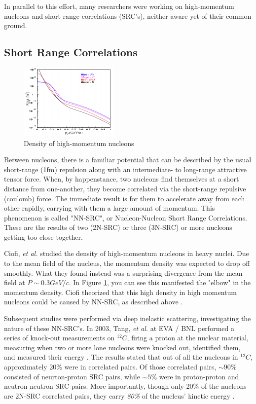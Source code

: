 \documentclass[11pt]{article}
\begin{document}
In parallel to this effort, many researchers were working on high-momentum nucleons and short range correlations (SRC's), neither aware yet of their common ground.

\subsection{Short Range Correlations}

\begin{figure}
  \begin{center}
    \includegraphics[width=0.43\textwidth]{src.png}
  \end{center}
  \caption{Density of high-momentum nucleons \cite{PhysRevC.76.055206}}
  \label{fig:src}
\end{figure}

Between nucleons, there is a familiar potential that can be described by the usual short-range (1fm) repulsion along with an intermediate- to long-range attractive tensor force. When, by happenstance, two nucleons find themselves at a short distance from one-another, they become correlated via the short-range repulsive (coulomb) force. The immediate result is for them to accelerate away from each other rapidly, carrying with them a large amount of momentum. This phenomenon is called "NN-SRC", or Nucleon-Nucleon Short Range Correlations. These are the results of two (2N-SRC) or three (3N-SRC) or more nucleons getting too close together.

Ciofi, \emph{et al.} studied the density of high-momentum nucleons in heavy nuclei.  Due to the mean field of the nucleus, the momentum density was expected to drop off smoothly. What they found instead was a surprising divergence from the mean field at $P \sim 0.3 GeV/c$. In Figure \ref{fig:src}, you can see this manifested the "elbow" in the momentum density. Ciofi theorized that this high density in high momentum nucleons could be caused by NN-SRC, as described above \cite{PhysRevC.53.1689}.

Subsequent studies were performed via deep inelastic scattering, investigating the nature of these NN-SRC's. In 2003, Tang, \emph{et al.} at EVA / BNL performed a series of knock-out measurements on $^{12}C$, firing a proton at the nuclear material, measuring when two or more lone nucleons were knocked out, identified them, and measured their energy \cite{PhysRevLett.90.042301}.  The results stated that out of all the nucleons in $^{12}C$, approximately 20\% were in correlated pairs. Of those correlated pairs, $\sim90\%$ consisted of neurton-proton SRC pairs, while $\sim 5\%$ were in proton-proton and neutron-neutron SRC pairs. More importantly, though only 20\% of the nucleons are 2N-SRC correlated pairs, they carry \emph{80\%} of the nucleus' kinetic energy \cite{Subedi:2008zz}.
\end{document}
